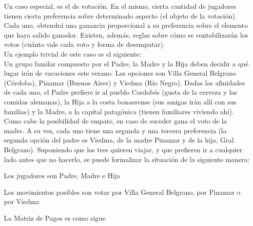 \documentclass[10pt]{article}
\numberwithin{equation}{section}
\numberwithin{figure}{section}
\numberwithin{table}{section}
\begin{document}
Un caso especial, es el de votación. En el mismo, cierta cantidad de jugadores tienen cierta preferencia sobre determinado aspecto (el objeto de la votación). Cada uno, obtendrá una ganancia proporcional a su preferencia sobre el elemento que haya salido ganador. Existen, además, reglas sobre cómo se contabilizarán los votos (cuánto vale cada voto y forma de desempatar).\\

Un ejemplo trivial de este caso es el siguiente:\\

Un grupo familar compuesto por el Padre, la Madre y la Hija deben decidir a qué lugar irán de vacaciones este verano. Las opciones son Villa General Belgrano (Córdoba), Pinamar (Buenos Aires) y Viedma (Río Negro). Dadas las afinidades de cada uno, el Padre prefiere ir al pueblo Cordobés (gusta de la cerveza y las comidas alemanas), la Hija a la costa bonaerense (sus amigas irán allí con sus familias) y la Madre, a la capital patagónica (tienen familiares viviendo ahí). Como cabe la posibilidad de empate, en caso de suceder gana el voto de la madre. A su vez, cada uno tiene una segunda y una tercera preferencia (la segunda opción del padre es Viedma, de la madre Pinamar y de la hija, Gral. Belgrano). Suponiendo que los tres quieren viajar, y que prefieren ir a cualquier lado antes que no hacerlo, se puede formalizar la situación de la siguiente manera:\\

\begin{list}{*}{}
  \item Los jugadores son Padre, Madre e Hija
  \item Los movimientos posibles son votar por Villa General Belgrano, por Pinamar o por Viedma
  \item La Matriz de Pagos es como sigue
\end{list}
\end{document}
